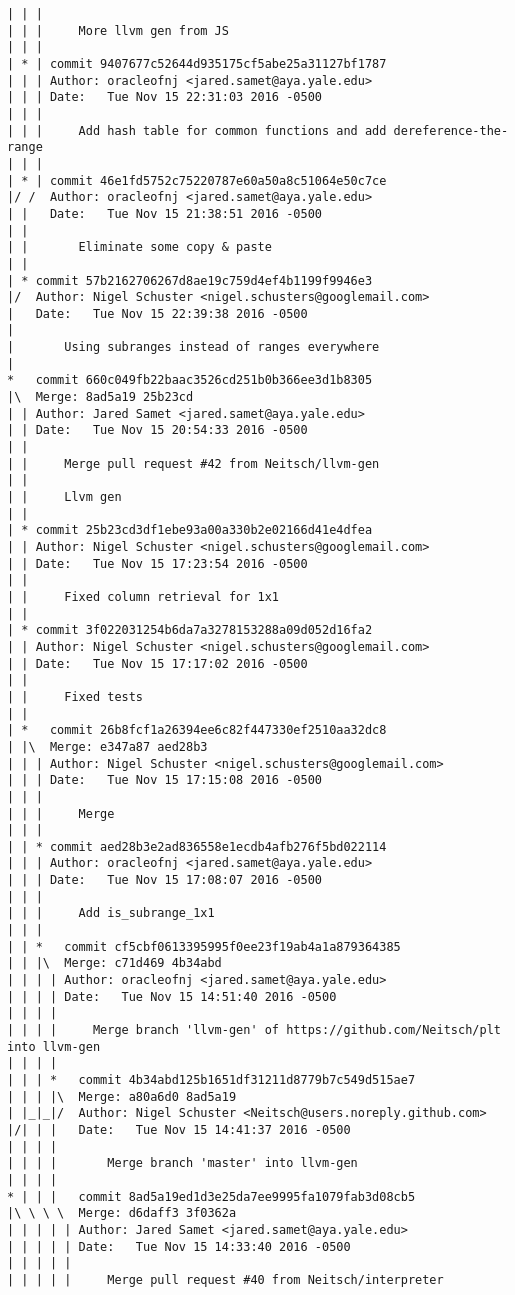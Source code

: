 \begin{lstlisting}
| | |     
| | |     More llvm gen from JS
| | |    
| * | commit 9407677c52644d935175cf5abe25a31127bf1787
| | | Author: oracleofnj <jared.samet@aya.yale.edu>
| | | Date:   Tue Nov 15 22:31:03 2016 -0500
| | | 
| | |     Add hash table for common functions and add dereference-the-range
| | |    
| * | commit 46e1fd5752c75220787e60a50a8c51064e50c7ce
|/ /  Author: oracleofnj <jared.samet@aya.yale.edu>
| |   Date:   Tue Nov 15 21:38:51 2016 -0500
| |   
| |       Eliminate some copy & paste
| |   
| * commit 57b2162706267d8ae19c759d4ef4b1199f9946e3
|/  Author: Nigel Schuster <nigel.schusters@googlemail.com>
|   Date:   Tue Nov 15 22:39:38 2016 -0500
|   
|       Using subranges instead of ranges everywhere
|    
*   commit 660c049fb22baac3526cd251b0b366ee3d1b8305
|\  Merge: 8ad5a19 25b23cd
| | Author: Jared Samet <jared.samet@aya.yale.edu>
| | Date:   Tue Nov 15 20:54:33 2016 -0500
| | 
| |     Merge pull request #42 from Neitsch/llvm-gen
| |     
| |     Llvm gen
| |   
| * commit 25b23cd3df1ebe93a00a330b2e02166d41e4dfea
| | Author: Nigel Schuster <nigel.schusters@googlemail.com>
| | Date:   Tue Nov 15 17:23:54 2016 -0500
| | 
| |     Fixed column retrieval for 1x1
| |   
| * commit 3f022031254b6da7a3278153288a09d052d16fa2
| | Author: Nigel Schuster <nigel.schusters@googlemail.com>
| | Date:   Tue Nov 15 17:17:02 2016 -0500
| | 
| |     Fixed tests
| |     
| *   commit 26b8fcf1a26394ee6c82f447330ef2510aa32dc8
| |\  Merge: e347a87 aed28b3
| | | Author: Nigel Schuster <nigel.schusters@googlemail.com>
| | | Date:   Tue Nov 15 17:15:08 2016 -0500
| | | 
| | |     Merge
| | |    
| | * commit aed28b3e2ad836558e1ecdb4afb276f5bd022114
| | | Author: oracleofnj <jared.samet@aya.yale.edu>
| | | Date:   Tue Nov 15 17:08:07 2016 -0500
| | | 
| | |     Add is_subrange_1x1
| | |      
| | *   commit cf5cbf0613395995f0ee23f19ab4a1a879364385
| | |\  Merge: c71d469 4b34abd
| | | | Author: oracleofnj <jared.samet@aya.yale.edu>
| | | | Date:   Tue Nov 15 14:51:40 2016 -0500
| | | | 
| | | |     Merge branch 'llvm-gen' of https://github.com/Neitsch/plt into llvm-gen
| | | |       
| | | *   commit 4b34abd125b1651df31211d8779b7c549d515ae7
| | | |\  Merge: a80a6d0 8ad5a19
| |_|_|/  Author: Nigel Schuster <Neitsch@users.noreply.github.com>
|/| | |   Date:   Tue Nov 15 14:41:37 2016 -0500
| | | |   
| | | |       Merge branch 'master' into llvm-gen
| | | |       
* | | |   commit 8ad5a19ed1d3e25da7ee9995fa1079fab3d08cb5
|\ \ \ \  Merge: d6daff3 3f0362a
| | | | | Author: Jared Samet <jared.samet@aya.yale.edu>
| | | | | Date:   Tue Nov 15 14:33:40 2016 -0500
| | | | | 
| | | | |     Merge pull request #40 from Neitsch/interpreter

\end{lstlisting}
